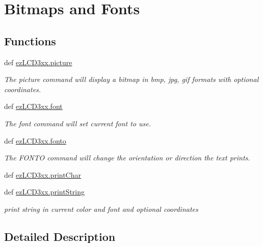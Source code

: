 \hypertarget{group___bitmap_font}{\section{Bitmaps and Fonts}
\label{d2/d7e/group___bitmap_font}
}
\subsection*{Functions}
\begin{DoxyCompactItemize}
\item 
def \hyperlink{group___bitmap_font_ga3bdde0a3f8505adbfb3c4b7107da7650}{ez\-L\-C\-D3xx.\-picture}
\begin{DoxyCompactList}\small\item\em The picture command will display a bitmap in bmp, jpg, gif formats with optional coordinates. \end{DoxyCompactList}\item 
def \hyperlink{group___bitmap_font_ga7099c8ffc9b76ad3213d241bb8b8070f}{ez\-L\-C\-D3xx.\-font}
\begin{DoxyCompactList}\small\item\em The font command will set current font to use. \end{DoxyCompactList}\item 
def \hyperlink{group___bitmap_font_ga445e7a916dbdae456f88bea5fcd88745}{ez\-L\-C\-D3xx.\-fonto}
\begin{DoxyCompactList}\small\item\em The F\-O\-N\-T\-O command will change the orientation or direction the text prints. \end{DoxyCompactList}\item 
def \hyperlink{group___bitmap_font_gafe8f092541df1ab4d72798e5f3b4e66d}{ez\-L\-C\-D3xx.\-print\-Char}
\item 
def \hyperlink{group___bitmap_font_gac3a90d479a0423de66988b9850f4852c}{ez\-L\-C\-D3xx.\-print\-String}
\begin{DoxyCompactList}\small\item\em print string in current color and font and optional coordinates \end{DoxyCompactList}\end{DoxyCompactItemize}


\subsection{Detailed Description}


